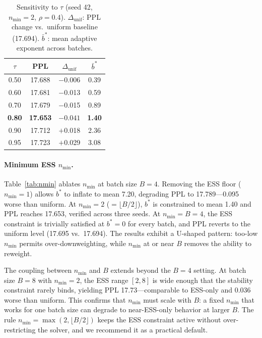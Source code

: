 \begin{table}[t]
\centering
\small
\begin{tabular}{@{}cccc@{}}
\toprule
$\tau$ & \textbf{PPL} & $\Delta_{\mathrm{unif}}$ & $\bar{b}^*$ \\
\midrule
0.50 & 17.688 & $-$0.006 & 0.39 \\
0.60 & 17.681 & $-$0.013 & 0.59 \\
0.70 & 17.679 & $-$0.015 & 0.89 \\
\textbf{0.80} & \textbf{17.653} & $\mathbf{-0.041}$ & \textbf{1.40} \\
0.90 & 17.712 & $+$0.018 & 2.36 \\
0.95 & 17.723 & $+$0.029 & 3.08 \\
\bottomrule
\end{tabular}
\caption{Sensitivity to $\tau$ (seed 42, $n_{\min}{=}2$, $\rho{=}0.4$).
$\Delta_{\mathrm{unif}}$: PPL change vs.\ uniform baseline (17.694).
$\bar{b}^*$: mean adaptive exponent across batches.}
\label{tab:tau}
\end{table}

\paragraph{Minimum ESS $n_{\min}$.}
Table~\ref{tab:nmin} ablates $n_{\min}$ at batch size $B{=}4$.
Removing the ESS floor ($n_{\min} = 1$) allows $b^*$ to inflate to mean 7.20, degrading PPL to 17.789---0.095 worse than uniform.
At $n_{\min} = 2$ ($= \lfloor B/2 \rfloor$), $b^*$ is constrained to mean 1.40 and PPL reaches 17.653, verified across three seeds.
At $n_{\min} = B = 4$, the ESS constraint is trivially satisfied at $b^* = 0$ for every batch, and PPL reverts to the uniform level (17.695 vs.\ 17.694).
The results exhibit a U-shaped pattern: too-low $n_{\min}$ permits over-downweighting, while $n_{\min}$ at or near $B$ removes the ability to reweight.

The coupling between $n_{\min}$ and $B$ extends beyond the $B{=}4$ setting.
At batch size $B{=}8$ with $n_{\min}{=}2$, the ESS range $[2, 8]$ is wide enough that the stability constraint rarely binds, yielding PPL 17.73---comparable to ESS-only and 0.036 worse than uniform.
This confirms that $n_{\min}$ must scale with $B$: a fixed $n_{\min}$ that works for one batch size can degrade to near-ESS-only behavior at larger $B$.
The rule $n_{\min} = \max(2, \lfloor B/2 \rfloor)$ keeps the ESS constraint active without over-restricting the solver, and we recommend it as a practical default.

